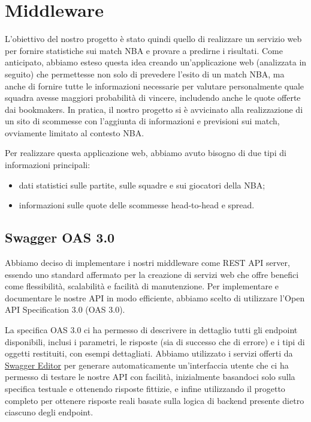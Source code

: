 \section{Middleware}

L'obiettivo del nostro progetto è stato quindi quello di realizzare un servizio web per fornire statistiche sui match NBA e provare a predirne i risultati. Come anticipato, abbiamo esteso questa idea creando un'applicazione web (analizzata in seguito) che permettesse non solo di prevedere l'esito di un match NBA, ma anche di fornire tutte le informazioni necessarie per valutare personalmente quale squadra avesse maggiori probabilità di vincere, includendo anche le quote offerte dai bookmakers. In pratica, il nostro progetto si è avvicinato alla realizzazione di un sito di scommesse con l'aggiunta di informazioni e previsioni sui match, ovviamente limitato al contesto NBA.

Per realizzare questa applicazione web, abbiamo avuto bisogno di due tipi di informazioni principali:
\begin{itemize}
    \item dati statistici sulle partite, sulle squadre e sui giocatori della NBA;
    \item informazioni sulle quote delle scommesse head-to-head e spread.
\end{itemize}

\subsection{Swagger OAS 3.0}

Abbiamo deciso di implementare i nostri middleware come REST API server, essendo uno standard affermato per la creazione di servizi web che offre benefici come flessibilità, scalabilità e facilità di manutenzione. Per implementare e documentare le nostre API in modo efficiente, abbiamo scelto di utilizzare l'Open API Specification 3.0 (OAS 3.0).

La specifica OAS 3.0 ci ha permesso di descrivere in dettaglio tutti gli endpoint disponibili, inclusi i parametri, le risposte (sia di successo che di errore) e i tipi di oggetti restituiti, con esempi dettagliati. Abbiamo utilizzato i servizi offerti da \href{https://editor.swagger.io/}{Swagger Editor} per generare automaticamente un'interfaccia utente che ci ha permesso di testare le nostre API con facilità, inizialmente basandoci solo sulla specifica testuale e ottenendo risposte fittizie, e infine utilizzando il progetto completo per ottenere risposte reali basate sulla logica di backend presente dietro ciascuno degli endpoint.


